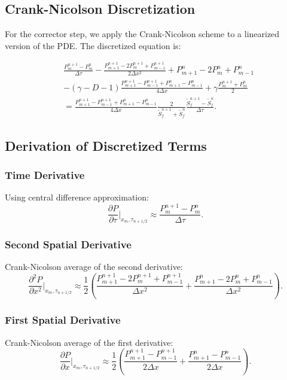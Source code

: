 \documentclass{article}
\begin{document}
\subsection{Crank-Nicolson Discretization}
For the corrector step, we apply the Crank-Nicolson scheme to a linearized version of the PDE. The discretized equation is:

\begin{equation}
\begin{aligned}
&\frac{P_{m}^{n+1}-P_{m}^{n}}{\Delta\tau} - \frac{P_{m+1}^{n+1}-2P_{m}^{n+1}+P_{m-1}^{n+1}}{2\Delta x^2} + P_{m+1}^{n} - 2P_{m}^{n} + P_{m-1}^{n} \\
&- (\gamma - D - 1) \frac{P_{m+1}^{n+1}-P_{m-1}^{n+1}+P_{m+1}^{n}-P_{m-1}^{n}}{4\Delta x} + \gamma \frac{P_{m}^{n+1}+P_{m}^{n}}{2} \\
&= \frac{P_{m+1}^{n+1}-P_{m-1}^{n+1}+P_{m+1}^{n}-P_{m-1}^{n}}{4\Delta x} \frac{2}{\tilde{S}_{f}^{n+1}+\tilde{S}_{f}^{n}} \frac{\tilde{S}_{f}^{n+1}-\tilde{S}_{f}^{n}}{\Delta\tau}.
\end{aligned}
\end{equation}

\subsection{Derivation of Discretized Terms}

\subsubsection{Time Derivative}
Using central difference approximation:
\begin{equation}
\frac{\partial P}{\partial \tau} \big|_{x_m, \tau_{n+1/2}} \approx \frac{P_m^{n+1} - P_m^n}{\Delta \tau}.
\end{equation}

\subsubsection{Second Spatial Derivative}
Crank-Nicolson average of the second derivative:
\begin{equation}
\frac{\partial^2 P}{\partial x^2} \big|_{x_m, \tau_{n+1/2}} \approx \frac{1}{2}\left(\frac{P_{m+1}^{n+1} - 2P_m^{n+1} + P_{m-1}^{n+1}}{\Delta x^2} + \frac{P_{m+1}^n - 2P_m^n + P_{m-1}^n}{\Delta x^2}\right).
\end{equation}

\subsubsection{First Spatial Derivative}
Crank-Nicolson average of the first derivative:
\begin{equation}
\frac{\partial P}{\partial x} \big|_{x_m, \tau_{n+1/2}} \approx \frac{1}{2}\left(\frac{P_{m+1}^{n+1} - P_{m-1}^{n+1}}{2\Delta x} + \frac{P_{m+1}^n - P_{m-1}^n}{2\Delta x}\right).
\end{equation}
\end{document}
